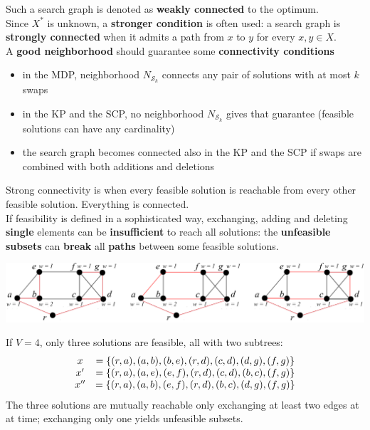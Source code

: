 Such a search graph is denoted as \textbf{weakly connected} to the optimum.\\

Since $X^\ast$ is unknown, a \textbf{stronger condition} is often used: a search graph is \textbf{strongly connected} when it admits a path from $x$ to $y$ for every $x, y \in X$.\\

A \textbf{good neighborhood} should guarantee some \textbf{connectivity conditions}
\begin{itemize}
	\item in the MDP, neighborhood $N_{\mathcal{S}_k}$ connects any pair of solutions with at most $k$ swaps
	
	\item in the KP and the SCP, no neighborhood $N_{\mathcal{S}_k}$ gives that guarantee (feasible solutions can have any cardinality)
	
	\item the search graph becomes connected also in the KP and the SCP if swaps are combined with both additions and deletions
\end{itemize}

Strong connectivity is when every feasible solution is reachable from every other feasible solution. Everything is connected.\\

If feasibility is defined in a sophisticated way, exchanging, adding and deleting \textbf{single} elements can be \textbf{insufficient} to reach all solutions: the \textbf{unfeasible subsets} can \textbf{break} all \textbf{paths} between some feasible solutions.

\begin{center}
	\includegraphics[width=\columnwidth]{img/connectivity}
\end{center}

If $V = 4$, only three solutions are feasible, all with two subtrees:
$$
\begin{array}{c c}
	x & = \{(r , a) , (a, b) , (b, e) , (r , d) , (c, d) , (d, g ) , (f , g )\} \\
	x' & = \{(r , a) , (a, e) , (e, f ) , (r , d) , (c, d) , (b, c) , (f , g )\} \\
	x'' & = \{(r , a) , (a, b) , (e, f ) , (r , d) , (b, c) , (d, g ) , (f , g )\}
\end{array}
$$
The three solutions are mutually reachable only exchanging at least two edges at at time; exchanging only one yields unfeasible subsets.


